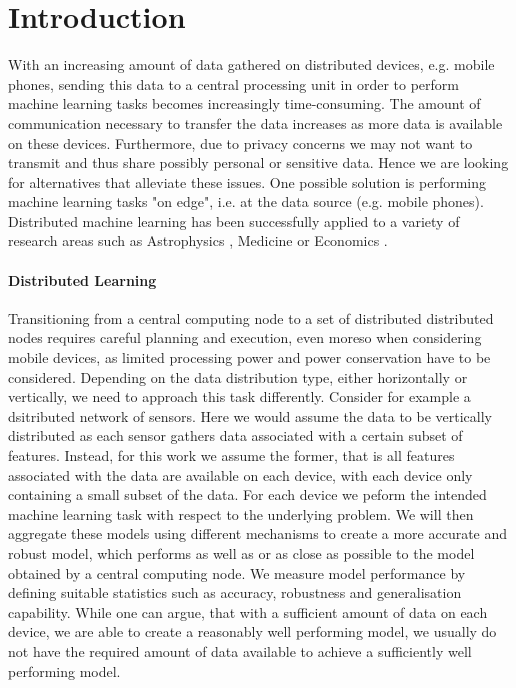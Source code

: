    
  \section{Introduction}
  With an increasing amount of data gathered on distributed devices, e.g. mobile phones, sending this data to a central processing unit in order to perform machine learning tasks becomes increasingly time-consuming.
  The amount of communication necessary to transfer the data increases as more data is available on these devices.
  Furthermore, due to privacy concerns we may not want to transmit and thus share possibly personal or sensitive data.
  Hence we are looking for alternatives that alleviate these issues.
  One possible solution is performing machine learning tasks "on edge", i.e. at the data source (e.g. mobile phones).
  Distributed machine learning has been successfully applied to a variety of research areas such as Astrophysics \cite{panousopoulou2017distributed}, Medicine \cite{deist2017infrastructure} or Economics \cite{kreitlein2015green}.

  \paragraph{Distributed Learning}

  Transitioning from a central computing node to a set of distributed distributed nodes requires careful planning and execution, even moreso when considering mobile devices, as limited processing power and power conservation have to be considered.
  Depending on the data distribution type, either horizontally or vertically, we need to approach this task differently. 
  Consider for example a dsitributed network of sensors.
  Here we would assume the data to be vertically distributed as each sensor gathers data associated with a certain subset of features.
  Instead, for this work we assume the former, that is all features associated with the data are available on each device, with each device only containing a small subset of the data.
  For each device we peform the intended machine learning task with respect to the underlying problem.
  We will then aggregate these models using different mechanisms to create a more accurate and robust model, which performs as well as or as close as possible to the model obtained by a central computing node.
  We measure model performance by defining suitable statistics such as accuracy, robustness and generalisation capability.
  While one can argue, that with a sufficient amount of data on each device, we are able to create a reasonably well performing model, we usually do not have the required amount of data available to achieve a sufficiently well performing model.
    
